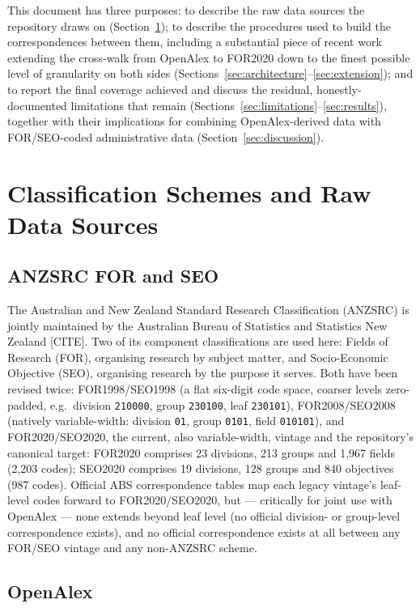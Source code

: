 \documentclass[11pt]{article}
\begin{document}
This document has three purposes: to describe the raw data sources the repository draws
on (Section~\ref{sec:data}); to describe the procedures used to build the correspondences
between them, including a substantial piece of recent work extending the cross-walk from
OpenAlex to FOR2020 down to the finest possible level of granularity on both sides
(Sections~\ref{sec:architecture}--\ref{sec:extension}); and to report the final coverage
achieved and discuss the residual, honestly-documented limitations that remain
(Sections~\ref{sec:limitations}--\ref{sec:results}), together with their implications for
combining OpenAlex-derived data with FOR/SEO-coded administrative data
(Section~\ref{sec:discussion}).

\section{Classification Schemes and Raw Data Sources}
\label{sec:data}

\subsection{ANZSRC FOR and SEO}

The Australian and New Zealand Standard Research Classification (ANZSRC) is jointly
maintained by the Australian Bureau of Statistics and Statistics New Zealand [CITE]. Two
of its component classifications are used here: Fields of Research (FOR), organising
research by subject matter, and Socio-Economic Objective (SEO), organising research by
the purpose it serves. Both have been revised twice: FOR1998/SEO1998 (a flat six-digit
code space, coarser levels zero-padded, e.g.\ division \texttt{210000}, group
\texttt{230100}, leaf \texttt{230101}), FOR2008/SEO2008 (natively variable-width:
division \texttt{01}, group \texttt{0101}, field \texttt{010101}), and FOR2020/SEO2020,
the current, also variable-width, vintage and the repository's canonical target: FOR2020
comprises 23 divisions, 213 groups and 1{,}967 fields (2{,}203 codes); SEO2020 comprises
19 divisions, 128 groups and 840 objectives (987 codes). Official ABS correspondence
tables map each legacy vintage's leaf-level codes forward to FOR2020/SEO2020, but ---
critically for joint use with OpenAlex --- none extends beyond leaf level (no official
division- or group-level correspondence exists), and no official correspondence exists
at all between any FOR/SEO vintage and any non-ANZSRC scheme.

\subsection{OpenAlex}
\end{document}
